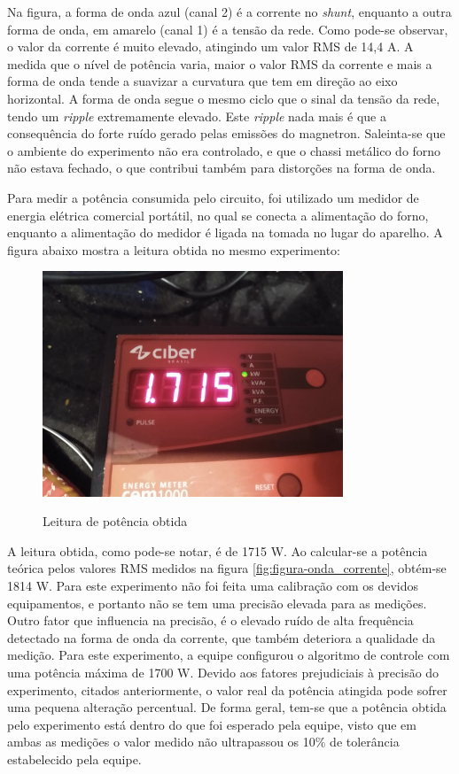 Na figura, a forma de onda azul (canal 2) é a corrente no \textit{shunt}, enquanto a outra forma de onda, em amarelo (canal 1) é a tensão da rede. Como pode-se observar, o valor da corrente é muito elevado, atingindo um valor RMS de 14,4 A.  A medida que o nível de potência varia, maior o valor RMS da corrente e mais a forma de onda tende a suavizar a curvatura que tem em direção ao eixo horizontal. A forma de onda segue o mesmo ciclo que o sinal da tensão da rede, tendo um \textit{ripple} extremamente elevado. Este \textit{ripple} nada mais é que a consequência do forte ruído gerado pelas emissões do magnetron. Saleinta-se que o ambiente do experimento não era controlado, e que o chassi metálico do forno não estava fechado, o que contribui também para distorções na forma de onda.

Para medir a potência consumida pelo circuito, foi utilizado um medidor de energia elétrica comercial portátil, no qual se conecta a alimentação do forno, enquanto a alimentação do medidor é ligada na tomada no lugar do aparelho. A figura abaixo mostra a leitura obtida no mesmo experimento:

\begin{figure}[H]
    \centering
    \caption{Leitura de potência obtida}
    \includegraphics[width=0.8\textwidth]{./dados/figuras/medida_potencia_full}
    \label{fig:figura-medida_potencia_full}
\end{figure}

A leitura obtida, como pode-se notar, é de 1715 W. Ao calcular-se a potência teórica pelos valores RMS medidos na figura \ref{fig:figura-onda_corrente}, obtém-se 1814 W. Para este experimento não foi feita uma calibração com os devidos equipamentos, e portanto não se tem uma precisão elevada para as medições. Outro fator que influencia na precisão, é o elevado ruído de alta frequência detectado na forma de onda da corrente, que também deteriora a qualidade da medição. Para este experimento, a equipe configurou o algoritmo de controle com uma potência máxima de 1700 W. Devido aos fatores prejudiciais à precisão do experimento, citados anteriormente, o valor real da potência atingida pode sofrer uma pequena alteração percentual. De forma geral, tem-se que a potência obtida pelo experimento está dentro do que foi esperado pela equipe, visto que em ambas as medições o valor medido não ultrapassou os 10\% de tolerância estabelecido pela equipe.

